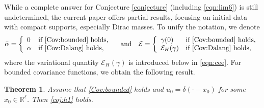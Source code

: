 \documentclass[12pt,reqno]{amsart}
\newtheorem{theorem}{Theorem}[section]
\theoremstyle{remark}
\newcommand{\1}{\mathbf{1}}
\def\RR{\mathbb{R}}
\def\Z{\mathcal{Z}}
\def\cee{{\mathcal E}}
\def\lt{\left}
\def\rt{\right}
\begin{document}
	While a complete answer for Conjecture \ref{conjecture} (including \eqref{eqn:lim6}) is still undetermined, the current paper offers partial results, focusing on initial data with compact supports, especially Dirac masses. 
	To unify the notation, we denote 
\begin{equation}\label{eq:unify notation}
 	\bar \alpha=
 	\lt\{
 		\begin{array}{ll}
 			0&\mbox{if \ref{Cov:bounded} holds},
 			\\\alpha&\mbox{if \ref{Cov:Dalang} holds},
 		\end{array}
 	\rt.
 	\quad\mbox{and}\quad
 	\cee=
 	\lt\{
 		\begin{array}{ll}
 			\gamma(0)&\mbox{if \ref{Cov:bounded} holds},
 			\\\cee_H(\gamma)&\mbox{if \ref{Cov:Dalang} holds},
 		\end{array}
 	\rt.
\end{equation} 
	where the variational quantity $\cee_H(\gamma)$ is introduced below in \eqref{eqn:cee}. 
	For bounded covariance functions, we obtain the following result.
	\begin{theorem}\label{thm:H1Z}
		Assume that \ref{Cov:bounded} holds and $u_0=\delta(\cdot - x_0)$ for some $x_0\in\RR^\ell$.
		Then \eqref{coj:h1} holds.
	\end{theorem}	
	
\end{document}

